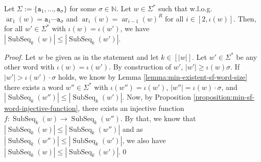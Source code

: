 \documentclass[runningheads,UKenglish,cleveref, autoref, thm-restate]{llncs}
\newcommand{\N}{\mathbb{N}}
\def\ta{\mathtt{a}}
\DeclareMathOperator{\arch}{ar}
\DeclareMathOperator\ScatFact{SubSeq}
\newif\ifpaper
\begin{document}
\begin{theorem}\label{theorem:min-sf-word}
    Let $\Sigma := \{\ta_1,\ldots,\ta_\sigma\}$ for some $\sigma\in\N$.
    Let $w\in\Sigma^*$ such that w.l.o.g. $\arch_1(w) = \ta_1\cdots\ta_\sigma$ and $\arch_i(w) = \arch_{i-1}(w)^R$ for all $i\in[2,\iota(w)]$. Then, for all $w'\in\Sigma^*$ with $\iota(w) = \iota(w')$, we have $|\ScatFact_k(w)| \leq |\ScatFact_k(w')|$.
\end{theorem}
\ifpaper
\begin{proof}
	Let $w$ be given as in the statement and let $k\in[|w|]$.
	Let $w'\in\Sigma^*$ be any other word with $\iota(w) = \iota(w')$.
	By construction of $w'$, $|w'| \geq \iota(w) \sigma$.
	If $|w'| > \iota(w')\cdot\sigma$ holds, we know by Lemma \ref{lemma:min-existent-sf-word-size} there exists
	a word $w''\in\Sigma^*$ with $\iota(w'') = \iota(w')$, $|w''| = \iota(w)\cdot\sigma$, and $|\ScatFact_k(w'')| \leq |\ScatFact_k(w')|$.
	Now, by Proposition \ref{proposition:min-sf-word-injective-function}, there exists an injective function
	$f : \ScatFact_k(w) \rightarrow \ScatFact_k(w'')$.
	By that, we know that $|\ScatFact_k(w)| \leq |\ScatFact_k(w'')|$ and as $|\ScatFact_k(w'')| \leq |\ScatFact_k(w')|$, we also
	have $|\ScatFact_k(w)| \leq |\ScatFact_k(w')|$.\qed
\end{proof}
\else
\begin{proof}
	Let $w$ be given as in the statement and let $k\in[|w|]$.
	Let $w'\in\Sigma^*$ be any other word with $\iota(w) = \iota(w')$.
	By construction of $w'$, $|w'| \geq \iota(w) \sigma$.
	If $|w'| > \iota(w')\cdot\sigma$ holds, we know by Lemma \ref{lemma:min-existent-sf-word-size} there exists
	a word $w''\in\Sigma^*$ with $\iota(w'') = \iota(w')$, $|w''| = \iota(w)\cdot\sigma$, and $|\ScatFact_k(w'')| \leq |\ScatFact_k(w')|$.
	Now, by Proposition \ref{proposition:min-sf-word-injective-function}, there exists an injective function
	$f : \ScatFact_k(w) \rightarrow \ScatFact_k(w'')$.
	By that, we know that $|\ScatFact_k(w)| \leq |\ScatFact_k(w'')|$ and as $|\ScatFact_k(w'')| \leq |\ScatFact_k(w')|$, we also
	have $|\ScatFact_k(w)| \leq |\ScatFact_k(w')|$.\qed
\end{proof}
\fi
\end{document}
